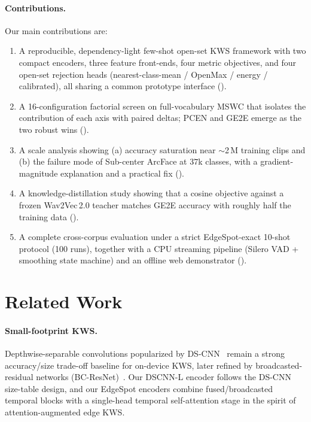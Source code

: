 \documentclass[10pt,twocolumn]{article}
\begin{document}
\paragraph{Contributions.} Our main contributions are:
\begin{enumerate}[leftmargin=1.4em,itemsep=2pt]
\item A reproducible, dependency-light few-shot open-set KWS framework with two
compact encoders, three feature front-ends, four metric objectives, and four
open-set rejection heads (nearest-class-mean / OpenMax / energy / calibrated),
all sharing a common prototype interface ().
\item A 16-configuration factorial screen on full-vocabulary MSWC that isolates
the contribution of each axis with paired deltas; PCEN and GE2E emerge as the
two robust wins ().
\item A scale analysis showing (a) accuracy saturation near $\sim$2\,M training
clips and (b) the failure mode of Sub-center ArcFace at $37$k classes, with a
gradient-magnitude explanation and a practical fix ().
\item A knowledge-distillation study showing that a cosine objective against a
frozen Wav2Vec\,2.0 teacher matches GE2E accuracy with roughly half the training
data ().
\item A complete cross-corpus evaluation under a strict EdgeSpot-exact 10-shot
protocol (100 runs), together with a CPU streaming pipeline (Silero VAD +
smoothing state machine) and an offline web demonstrator ().
\end{enumerate}

\section{Related Work}\label{sec:related}

\paragraph{Small-footprint KWS.}
Depthwise-separable convolutions popularized by DS-CNN~\cite{zhang2017hello}
remain a strong accuracy/size trade-off baseline for on-device KWS, later refined
by broadcasted-residual networks (BC-ResNet)~\cite{kim2021bcresnet}. Our DSCNN-L
encoder follows the DS-CNN size-table design, and our EdgeSpot encoders combine
fused/broadcasted temporal blocks with a single-head temporal self-attention
stage in the spirit of attention-augmented edge KWS.
\end{document}
